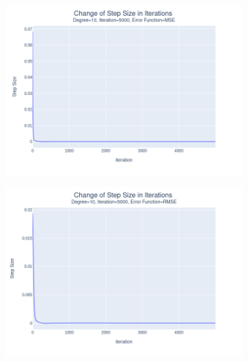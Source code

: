 \documentclass[14pt,a4]{article}
\begin{document}
\begin{figure}[h]
\begin{subfigure}{0.3\textwidth}
        \includegraphics[width=\textwidth]{images/implementation/q1/part_d/step_size/10_5000_MSE.png}
    \end{subfigure}
    \hfill
    \begin{subfigure}{0.3\linewidth}
        \centering
        \includegraphics[width=\textwidth]{images/implementation/q1/part_d/step_size/10_5000_RMSE.png}
    \end{subfigure}
    \newline
    \begin{subfigure}{0.3\linewidth}
        \centering

\end{subfigure}
\end{figure}
\end{document}
